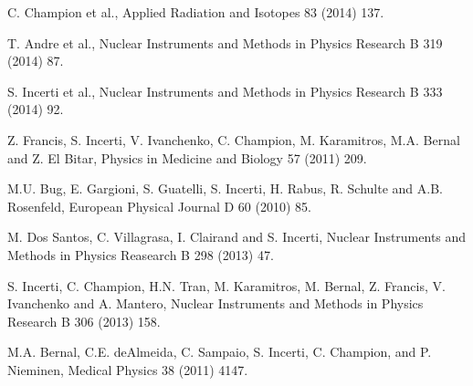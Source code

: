  C. Champion et al., Applied Radiation and Isotopes 83 (2014) 137.


 T. Andre et al.,
                     Nuclear Instruments and Methods in Physics Research B 319 (2014) 87.


 S. Incerti et al.,
                       Nuclear Instruments and Methods in Physics Research B 333 (2014) 92.

 Z. Francis, S. Incerti, V. Ivanchenko, C. Champion, M. Karamitros,
                       M.A. Bernal and Z. El Bitar,
                       Physics in Medicine and Biology 57 (2011) 209.

 M.U. Bug, E. Gargioni, S. Guatelli, S. Incerti, H. Rabus,
                       R. Schulte and A.B. Rosenfeld,
                       European Physical Journal D 60 (2010) 85.

 M. Dos Santos, C. Villagrasa, I. Clairand and S. Incerti, 
                         Nuclear Instruments and Methods in Physics Reasearch B 298 (2013) 47.

 S. Incerti, C. Champion, H.N. Tran, M. Karamitros, M. Bernal, Z. Francis,
                         V. Ivanchenko and A. Mantero,
                         Nuclear Instruments and Methods in Physics Research B 306 (2013) 158.

 M.A. Bernal, C.E. deAlmeida, C. Sampaio, S. Incerti, C. Champion,
                         and P. Nieminen,
                         Medical Physics 38 (2011) 4147.

